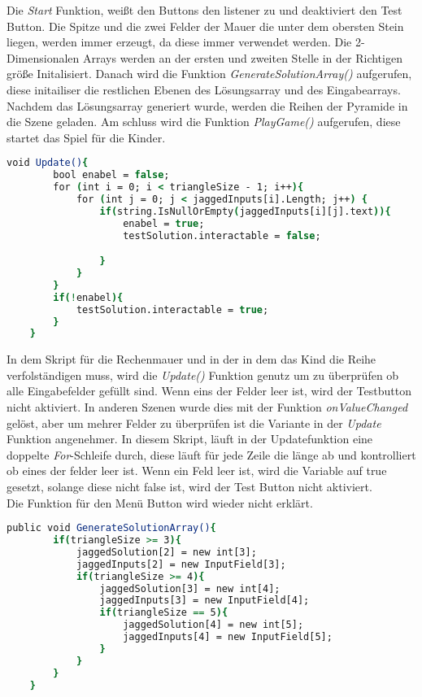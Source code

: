 Die \textit{Start} Funktion, weißt den Buttons den listener zu und deaktiviert den Test Button. Die Spitze und die zwei Felder der Mauer die unter dem obersten Stein liegen, werden immer erzeugt, da diese immer verwendet werden. Die 2-Dimensionalen Arrays werden an der ersten und zweiten Stelle in der Richtigen größe Initalisiert. Danach wird die Funktion \textit{GenerateSolutionArray()} aufgerufen, diese initailiser die restlichen Ebenen des Lösungsarray und des Eingabearrays. Nachdem das Lösungsarray generiert wurde, werden die Reihen der Pyramide in die Szene geladen. Am schluss wird die Funktion \textit{PlayGame()} aufgerufen, diese startet das Spiel für die Kinder.\\
\begin{lstlisting}[language=csh, caption={Triangle.cs Update-Funktion}]
	void Update(){
		bool enabel = false;
		for (int i = 0; i < triangleSize - 1; i++){
			for (int j = 0; j < jaggedInputs[i].Length; j++) {
				if(string.IsNullOrEmpty(jaggedInputs[i][j].text)){
					enabel = true;
					testSolution.interactable = false;

				}
			}
		}
		if(!enabel){
			testSolution.interactable = true;
		}
	}
\end{lstlisting}
In dem Skript für die Rechenmauer und in der in dem das Kind die Reihe verfolständigen muss, wird die \textit{Update()} Funktion genutz um zu überprüfen ob alle Eingabefelder gefüllt sind. Wenn eins der Felder leer ist, wird der Testbutton nicht aktiviert. In anderen Szenen wurde dies mit der Funktion \textit{onValueChanged} gelöst, aber um mehrer Felder zu überprüfen ist die Variante in der \textit{Update} Funktion angenehmer. In diesem Skript, läuft in der Updatefunktion eine doppelte \textit{For}-Schleife durch, diese läuft für jede Zeile die länge ab und kontrolliert ob eines der felder leer ist. Wenn ein Feld leer ist, wird die  Variable auf true gesetzt, solange diese nicht false ist, wird der Test Button nicht aktiviert.\\
Die Funktion für den Menü Button wird wieder nicht erklärt.\\
\begin{lstlisting}[language=csh, caption={Triangle.cs GenerateSolutionArray-Funktion}]
	public void GenerateSolutionArray(){
		if(triangleSize >= 3){
			jaggedSolution[2] = new int[3];
			jaggedInputs[2] = new InputField[3];
			if(triangleSize >= 4){
				jaggedSolution[3] = new int[4];
				jaggedInputs[3] = new InputField[4];
				if(triangleSize == 5){
					jaggedSolution[4] = new int[5];
					jaggedInputs[4] = new InputField[5];
				}
			}
		}
	}
\end{lstlisting}
